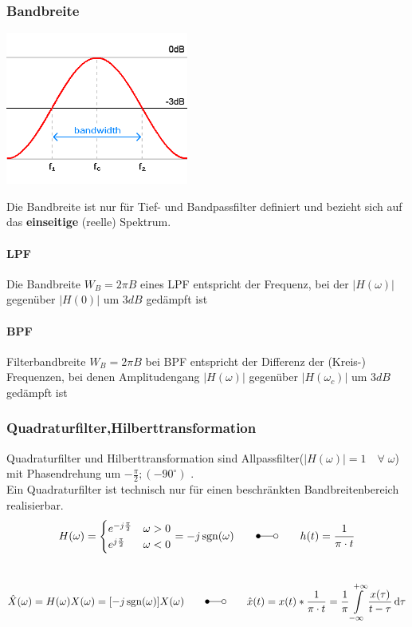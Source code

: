 	\subsubsection{Bandbreite }
	\begin{minipage}{7cm}
		\includegraphics[width=6cm]{bilder/filter_bandbreite.png}
	\end{minipage}
	\begin{minipage}{11cm}
		Die Bandbreite ist nur für Tief- und Bandpassfilter definiert und bezieht sich auf das \textbf{einseitige} (reelle) Spektrum.
		\paragraph{LPF}	
			Die Bandbreite $W_B = 2 \pi B$ eines LPF entspricht der Frequenz, bei der $|H(\omega)|$ gegenüber $|H(0)|$ um $3 dB$ gedämpft ist
		\paragraph{BPF}	
			Filterbandbreite $W_B = 2 \pi B$ bei BPF entspricht der Differenz der (Kreis-) Frequenzen, bei denen Amplitudengang $|H(\omega)|$ gegenüber $|H(\omega_c)|$ um $3 dB$ gedämpft ist
	\end{minipage}


	\subsubsection{Quadraturfilter,Hilberttransformation }
		\label{lti_quadratur}\label{lti_hilbert}
		Quadraturfilter und Hilberttransformation sind Allpassfilter($ |H(\omega)| = 1 \quad \forall \; \omega $) mit
		Phasendrehung um $-\frac{\pi}{2};(-90^\circ)$ %
		.\\
		Ein Quadraturfilter ist technisch nur für einen beschränkten Bandbreitenbereich realisierbar.
		\[
			H(\omega) = \begin{cases}
             	e^{-j \frac{\pi}{2}} & \omega > 0 \\
             	e^{j \frac{\pi}{2}} & \omega < 0
             \end{cases} =
				-j \sgn(\omega)
				\qquad \Laplace \qquad h(t) = \frac{1}{\pi \cdot t}
		\]
		 \\
		\[
			\hat{X}(\omega) = H(\omega)X(\omega) = [-j \sgn(\omega)] X(\omega) \qquad \Laplace \qquad \hat{x}(t) = x(t) \ast \frac{1}{\pi \cdot t} = \frac{1}{\pi} \int\limits_{-\infty}^{+\infty} \frac{x(\tau)}{t-\tau} \diff \tau
		\]